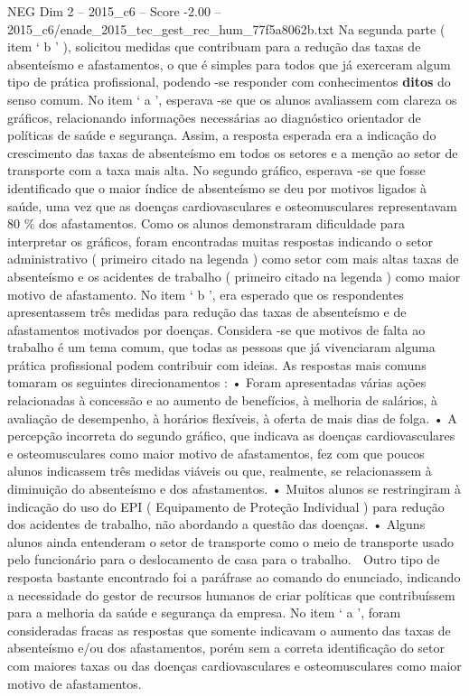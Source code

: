 \begin{textsample}{NEG Dim 2 – 2015\_c6 – Score -2.00 – 2015\_c6/enade\_2015\_tec\_gest\_rec\_hum\_77f5a8062b.txt}
Na segunda parte ( item ‘ b ’ ), solicitou medidas que contribuam para a redução das taxas de absenteísmo e afastamentos, o que é simples para todos que já exerceram algum tipo de prática profissional, podendo -se responder com conhecimentos \textbf{ditos} do senso comum.
No item ‘ a ’, esperava -se que os alunos avaliassem com clareza os gráficos, relacionando informações necessárias ao diagnóstico orientador de políticas de saúde e segurança.
Assim, a resposta esperada era a indicação do crescimento das taxas de absenteísmo em todos os setores e a menção ao setor de transporte com a taxa mais alta.
No segundo gráfico, esperava -se que fosse identificado que o maior índice de absenteísmo se deu por motivos ligados à saúde, uma vez que as doenças cardiovasculares e osteomusculares representavam 80 \% dos afastamentos.
Como os alunos demonstraram dificuldade para interpretar os gráficos, foram encontradas muitas respostas indicando o setor administrativo ( primeiro citado na legenda ) como setor com mais altas taxas de absenteísmo e os acidentes de trabalho ( primeiro citado na legenda ) como maior motivo de afastamento.
No item ‘ b ’, era esperado que os respondentes apresentassem três medidas para redução das taxas de absenteísmo e de afastamentos motivados por doenças.
Considera -se que motivos de falta ao trabalho é um tema comum, que todas as pessoas que já vivenciaram alguma prática profissional podem contribuir com ideias.
As respostas mais comuns tomaram os seguintes direcionamentos : • Foram apresentadas várias ações relacionadas à concessão e ao aumento de benefícios, à melhoria de salários, à avaliação de desempenho, à horários flexíveis, à oferta de mais dias de folga. • A percepção incorreta do segundo gráfico, que indicava as doenças cardiovasculares e osteomusculares como maior motivo de afastamentos, fez com que poucos alunos indicassem três medidas viáveis ou que, realmente, se relacionassem à diminuição do absenteísmo e dos afastamentos. • Muitos alunos se restringiram à indicação do uso do EPI ( Equipamento de Proteção Individual ) para redução dos acidentes de trabalho, não abordando a questão das doenças. • Alguns alunos ainda entenderam o setor de transporte como o meio de transporte usado pelo funcionário para o deslocamento de casa para o trabalho.  Outro tipo de resposta bastante encontrado foi a paráfrase ao comando do enunciado, indicando a necessidade do gestor de recursos humanos de criar políticas que contribuíssem para a melhoria da saúde e segurança da empresa.
No item ‘ a ’, foram consideradas fracas as respostas que somente indicavam o aumento das taxas de absenteísmo e/ou dos afastamentos, porém sem a correta identificação do setor com maiores taxas ou das doenças cardiovasculares e osteomusculares como maior motivo de afastamentos.

\end{textsample}
